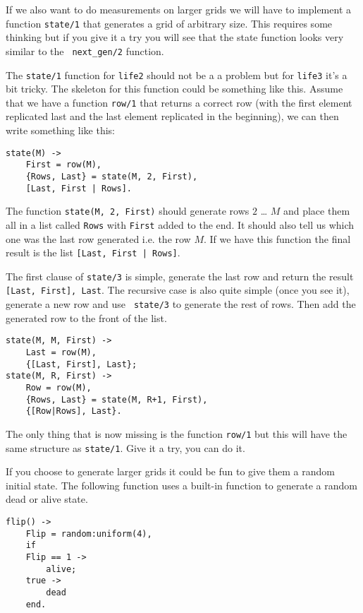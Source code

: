 \documentclass[a4paper,11pt]{article}
\begin{document}
If we also want to do measurements on larger grids we will have to
implement a function {\tt state/1} that generates a grid of arbitrary
size. This requires some thinking but if you give it a try you will
see that the state function looks very similar to the {\tt
  next\_gen/2} function. 

The {\tt state/1} function for {\tt life2} should not be a a problem
but for {\tt life3} it's a bit tricky. The skeleton for this function
could be something like this. Assume that we have a function {\tt row/1}
that returns a correct row (with the first element replicated last and
the last element replicated in the beginning), we can then write something like this:

\begin{verbatim}
state(M) ->
    First = row(M),
    {Rows, Last} = state(M, 2, First),
    [Last, First | Rows].
\end{verbatim} 

The function {\tt state(M, 2, First)} should generate rows $2$ \ldots
$M$ and place them all in a list called {\tt Rows} with {\tt First}
added to the end. It should also tell us which one was the last row
generated i.e. the row $M$. If we have this function the final result
is the list {\tt [Last, First | Rows]}.


The first clause of {\tt state/3} is simple, generate the last row and
return the result {\tt {[Last, First], Last}}. The recursive case is
also quite simple (once you see it), generate a new row and use {\tt
  state/3} to generate the rest of rows. Then add the generated row to
the front of the list.

\begin{verbatim}
state(M, M, First) ->
    Last = row(M),
    {[Last, First], Last};
state(M, R, First) -> 
    Row = row(M),
    {Rows, Last} = state(M, R+1, First),
    {[Row|Rows], Last}.
\end{verbatim} 

The only thing that is now missing is the function {\tt row/1} but
this will have the same structure as {\tt state/1}. Give it a try, you
can do it. 

If you choose to generate larger grids it could be fun to give them a
random initial state. The following function uses a built-in function
to generate a random dead or alive state. 

\begin{verbatim}
flip() ->
    Flip = random:uniform(4),
    if 
	Flip == 1 ->
	    alive;
	true ->
	    dead
    end.
\end{verbatim}
\end{document}
